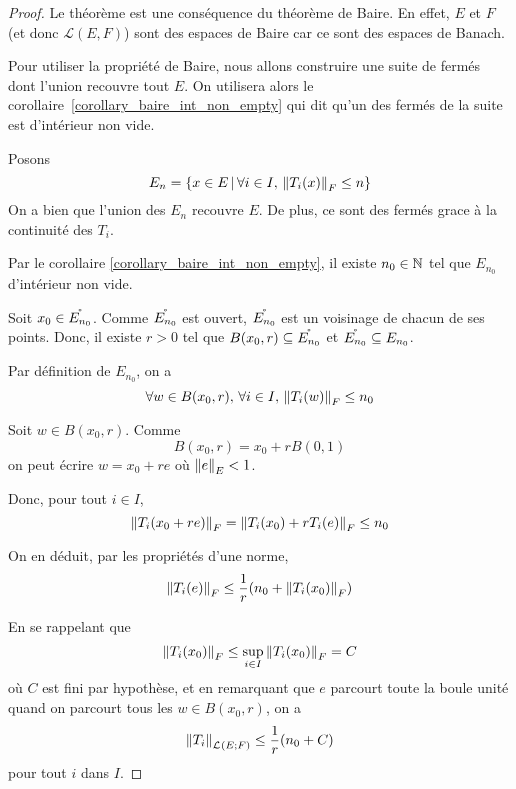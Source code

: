 \ifdefined\outputproof
\begin{proof}
	Le théorème est une conséquence du théorème de Baire. En effet, $E$ et $F$
	(et donc $\mathcal{L}(E, F)$) sont des espaces de Baire car ce sont des
	espaces de Banach.

	Pour utiliser la propriété de Baire, nous allons construire une suite de
	fermés dont l'union recouvre tout $E$. On utilisera alors le
	corollaire~\ref{corollary_baire_int_non_empty} qui dit qu'un des fermés de
	la suite est d'intérieur non vide.

	Posons
	\begin{equation}
		E_{n} = \left\{x \in E \, | \, \forall i \in I, \, \norm{T_{i}(x)}_{F} \leq n \right\}
	\end{equation}
	On a bien que l'union des $E_{n}$ recouvre $E$. De plus, ce sont des fermés
	grace à la continuité des $T_{i}$.

	Par le corollaire \ref{corollary_baire_int_non_empty}, il existe $n_{0} \in
	\mathbb{N}$ tel que $E_{n_{0}}$ d'intérieur non vide.

	Soit $x_{0} \in \mathring{E_{n_{0}}}$.
	Comme $\mathring{E_{n_{0}}}$ est ouvert, $\mathring{E_{n_{0}}}$ est un
	voisinage de chacun de ses points. Donc, il existe $r > 0$ tel que
	$B(x_{0}, r) \subseteq \mathring{E_{n_{0}}}$ et $\mathring{E_{n_{0}}} \subseteq
	E_{n_{0}}$.

	Par définition de $E_{n_{0}}$, on a
	\begin{equation}
		\forall w \in B(x_{0}, r), \, \forall i \in I, \,
		\norm{T_{i}(w)}_{F} \leq n_{0}
	\end{equation}

	Soit $w \in B(x_{0}, r)$. Comme
	\begin{equation}
		B(x_{0}, r) = x_{0} + r B(0, 1)
	\end{equation}
	on peut écrire $w = x_{0} + r e$ où $\norm{e}_{E} < 1$.

	Donc, pour tout $i \in I$,
	\begin{equation}
		\norm{T_{i}(x_{0} + re)}_{F} = \norm{T_{i}(x_{0}) +
		r T_{i}(e)}_{F} \leq n_{0}
	\end{equation}

	On en déduit, par les propriétés d'une norme,
	\begin{equation}
		\norm{T_{i}(e)}_{F} \leq \frac{1}{r} (n_{0} +
		\norm{T_{i}(x_{0})}_{F})
	\end{equation}

	En se rappelant que
	\begin{equation}
		\norm{T_{i}(x_{0})}_{F} \leq \sup_{i \in I}
		\norm{T_{i}(x_{0})}_{F} = C
	\end{equation}
	où $C$ est fini par hypothèse, et en remarquant que $e$ parcourt toute
	la boule unité quand on parcourt tous les $w \in B(x_{0}, r)$, on a
	\begin{equation}
		\norm{T_{i}}_{\mathcal{L}_{}(E; F)} \leq \frac{1}{r} (n_{0} + C)
	\end{equation}
	pour tout $i$ dans $I$.


\end{proof}
